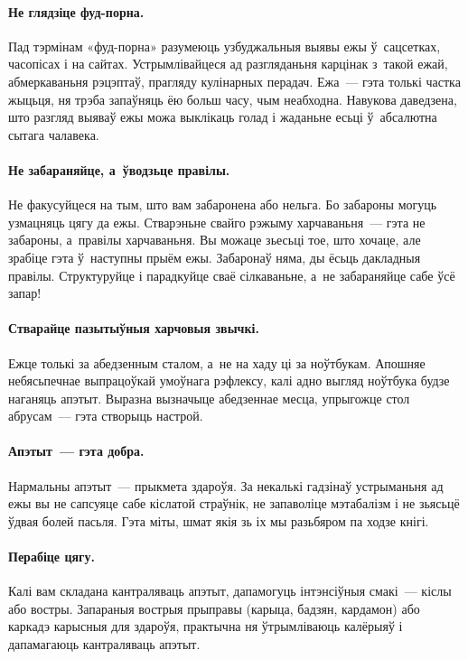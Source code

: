 \paragraph{Не глядзіце фуд-порна.}
Пад тэрмінам «фуд-порна» разумеюць узбуджальныя выявы ежы ў~сацсетках, часопісах і на сайтах. Устрымлівайцеся ад разгляданьня карцінак з~такой ежай, абмеркаваньня рэцэптаў, прагляду кулінарных перадач. Ежа~--- гэта толькі частка жыцьця, ня трэба запаўняць ёю больш часу, чым неабходна. Навукова даведзена, што разгляд выяваў ежы можа выклікаць голад і жаданьне есьці ў~абсалютна сытага чалавека.


\paragraph{Не забараняйце, а~ўводзьце правілы.}
Не факусуйцеся на тым, што вам забаронена або нельга. Бо забароны могуць узмацняць цягу да ежы. Стварэньне свайго рэжыму харчаваньня~--- гэта не забароны, а~правілы харчаваньня. Вы можаце зьесьці тое, што хочаце, але зрабіце гэта ў~наступны прыём ежы. Забаронаў няма, ды ёсьць дакладныя правілы. Структуруйце і парадкуйце сваё сілкаваньне, а~не забараняйце сабе ўсё запар!

\paragraph{Стварайце пазытыўныя харчовыя звычкі.}
Ежце толькі за абедзенным сталом, а~не на хаду ці за ноўтбукам. Апошняе небясьпечнае выпрацоўкай умоўнага рэфлексу, калі адно выгляд ноўтбука будзе наганяць апэтыт. Выразна вызначыце абедзеннае месца, упрыгожце стол абрусам~--- гэта створыць настрой.

\paragraph{Апэтыт~--- гэта добра.}
Нармальны апэтыт~--- прыкмета здароўя. За некалькі гадзінаў устрыманьня ад ежы вы не сапсуяце сабе кіслатой страўнік, не запаволіце мэтабалізм і не зьясьцё ўдвая болей пасьля. Гэта міты, шмат якія зь іх мы разьбяром па ходзе кнігі.

\paragraph{Перабіце цягу.}
Калі вам складана кантраляваць апэтыт, дапамогуць інтэнсіўныя смакі~--- кіслы або востры. Запараныя вострыя прыправы (карыца, бадзян, кардамон) або каркадэ карысныя для здароўя, практычна ня ўтрымліваюць калёрыяў і дапамагаюць кантраляваць апэтыт.

